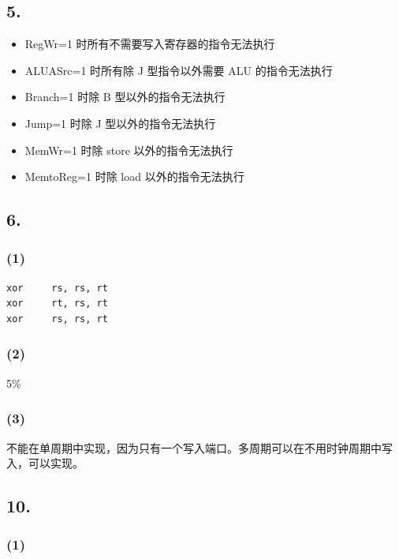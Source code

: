 \documentclass[12pt, a4paper]{ctexart}
\begin{document}
\subsection*{5.}

\begin{itemize}
    \item RegWr=1 时所有不需要写入寄存器的指令无法执行
    \item ALUASrc=1 时所有除 J 型指令以外需要 ALU 的指令无法执行
    \item Branch=1 时除 B 型以外的指令无法执行
    \item Jump=1 时除 J 型以外的指令无法执行
    \item MemWr=1 时除 store 以外的指令无法执行
    \item MemtoReg=1 时除 load 以外的指令无法执行
\end{itemize}

\subsection*{6.}

\subsubsection*{(1)}

\begin{lstlisting}[language={[RISC-V]Assembler}]
xor     rs, rs, rt
xor     rt, rs, rt
xor     rs, rs, rt
\end{lstlisting}

\subsubsection*{(2)}

5\%

\subsubsection*{(3)}

不能在单周期中实现，因为只有一个写入端口。多周期可以在不用时钟周期中写入，可以实现。

\subsection*{10.}

\subsubsection*{(1)}
\end{document}
